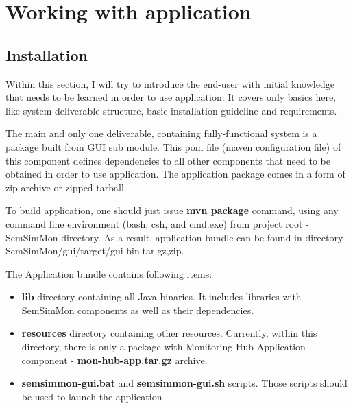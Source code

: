 %
\section{Working with application}

\subsection{Installation}
\label{sec:ch7_working_with}

Within this section, I will try to introduce the end-user with initial knowledge that needs to be learned in order to use application. It covers only basics here, like system deliverable structure, basic installation guideline and requirements.

The main and only one deliverable, containing fully-functional system is a package built from GUI sub module. This pom file (maven configuration file) of this component defines dependencies to all other components that need to be obtained in order to use application. The application package comes in a form of zip archive or zipped tarball.

To build application, one should just issue {\bf mvn package} command, using any command line environment (bash, csh, and cmd.exe) from project root - SemSimMon directory. As a result, application bundle can be found in directory SemSimMon/gui/target/gui-bin.{tar.gz,zip}.

The Application bundle contains following items:

\begin{itemize}

\item {\bf lib} directory containing all Java binaries. It includes libraries with SemSimMon components as well as their dependencies.

\item {\bf resources} directory containing other resources. Currently, within this directory, there is only a package with Monitoring Hub Application component - {\bf mon-hub-app.tar.gz} archive.

\item {\bf semsimmon-gui.bat} and {\bf semsimmon-gui.sh} scripts. Those scripts should be used to launch the application 

\end{itemize} 

